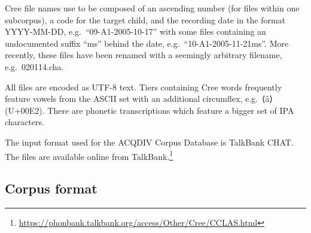 \documentclass[a4paper, 11pt]{book}
\begin{document}
Cree file names use to be composed of an ascending number (for files within one subcorpus), a code for the target child, and the recording date in the format YYYY-MM-DD, e.g.\ “09-A1-2005-10-17” with some files containing an undocumented suffix “ms” behind the date, e.g.\ “10-A1-2005-11-21ms”. More recently, these files have been renamed with a seemingly arbitrary filename, e.g.\ 020114.cha. 

All files are encoded as UTF-8 text. Tiers containing Cree words frequently feature vowels from the ASCII set with an additional circumflex, e.g.\ ⟨â⟩ (U+00E2). There are phonetic transcriptions which feature a bigger set of IPA characters. 

The input format used for the ACQDIV Corpus Database is TalkBank CHAT. The files are available online from TalkBank.\footnote{\url{https://phonbank.talkbank.org/access/Other/Cree/CCLAS.html}}

\subsection{Corpus format}
\end{document}
